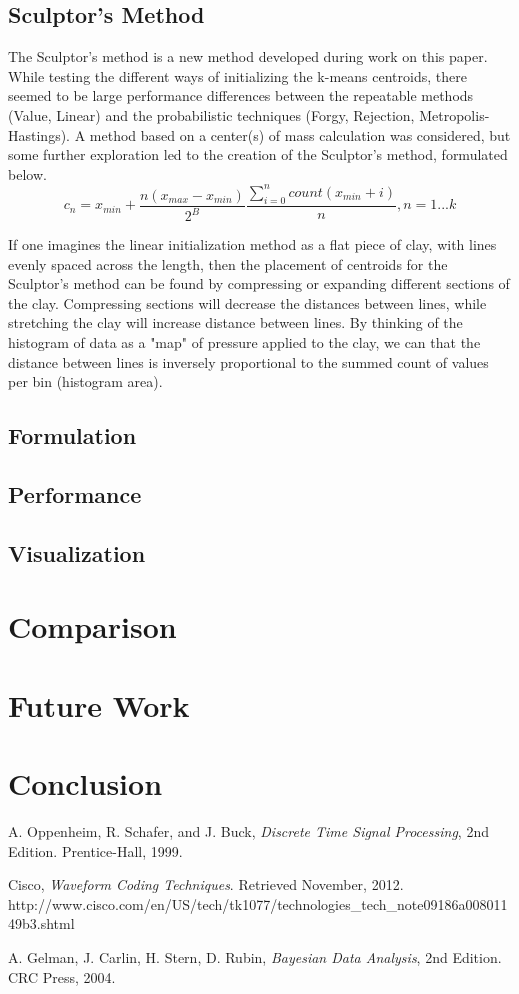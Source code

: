 \documentclass[journal]{IEEEtran}
\begin{document}
\subsection{Sculptor's Method}
The Sculptor's method is a new method developed during work on this paper. While testing the different ways of initializing the k-means centroids, there
seemed to be large performance differences between the repeatable methods (Value, Linear) and the probabilistic techniques (Forgy, Rejection, 
Metropolis-Hastings). A method based on a center(s) of mass calculation was considered, but some further exploration led to the creation of the 
Sculptor's method, formulated below.
\begin{equation}
    c_n = x_{min} + \frac{n(x_{max}-x_{min})}{2^B}\frac{\sum_{i=0}^{n}count(x_{min}+i)}{n}, n = 1...k 
\end{equation}

If one imagines the linear initialization method as a flat piece of clay, with lines evenly spaced across the length, then the placement of
centroids for the Sculptor's method can be found by compressing or expanding different sections of the clay. Compressing sections will decrease the
distances between lines, while stretching the clay will increase distance between lines. By thinking of the histogram of data as a "map" of pressure
applied to the clay, we can that the distance between lines is inversely proportional to the summed count of values per bin (histogram area).

\subsection{Formulation}
\subsection{Performance}
\subsection{Visualization}
\section{Comparison}
\section{Future Work}
\section{Conclusion}
\begin{thebibliography}{1}
A. Oppenheim, R. Schafer, and J. Buck, \emph{Discrete Time Signal Processing}, 2nd Edition. Prentice-Hall, 1999.

Cisco, \emph{Waveform Coding Techniques}. Retrieved November, 2012. http://www.cisco.com/en/US/tech/tk1077/technologies\_tech\_note09186a00801149b3.shtml 

A. Gelman, J. Carlin, H. Stern, D. Rubin, \emph{Bayesian Data Analysis}, 2nd Edition. CRC Press, 2004.
\end{thebibliography}
\end{document}
